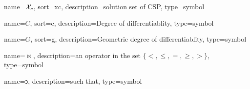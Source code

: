 	{%
		name=\ensuremath{\set{X}_{c}},
		sort=xc,
		description=solution set of CSP,
		type=symbol
	}
	\newcommand{\cspsolutionset}{\gls{sym:cspsolutionset}}

	{%
		name=\ensuremath{C},
		sort=c,
		description=Degree of differentiablity,
		type=symbol
	}
	\newcommand{\contdegbare}{\ensuremath{\gls{sym:contdegbare}}}
	\newcommand{\contdeg}[1]{\ensuremath{\contdegbare^{#1}}}

	{%
		name=\ensuremath{G},
		sort=g,
		description=Geometric degree of differentiablity,
		type=symbol
	}
	\newcommand{\contdeggeombare}{\ensuremath{\gls{sym:contdeggeombare}}}
	\newcommand{\contdeggeom}[1]{\ensuremath{\contdeggeombare^{#1}}}


	{%
		name=\ensuremath{\bowtie},
		description=an operator in the set \ensuremath{\{<, \leq, =, \geq, >\}},
		type=symbol
	}
	\newcommand{\relop}{\gls{sym:relop}}

	{%
		name={\ensuremath{\backepsilon}},
		description=such that,
		type=symbol
	}
	\newcommand{\suchthat}{\gls{sym:suchthat}}
